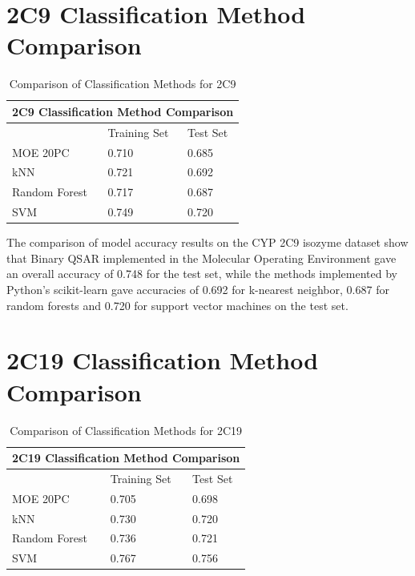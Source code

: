 \section{2C9 Classification Method Comparison}

\begin{table}[H]
\caption{Comparison of Classification Methods for 2C9}
\centering
\begin{tabular}{|l|l|l|}
\hline
\multicolumn{3}{|c|}{2C9 Classification Method Comparison} \\ \hline
          & Training Set & Test Set \\ \hline
MOE 20PC  & 0.710        & 0.685    \\ \hline
kNN       & 0.721        & 0.692    \\ \hline
Random Forest & 0.717    & 0.687    \\ \hline
SVM       & 0.749        & 0.720    \\ \hline
\end{tabular}
\end{table}

The comparison of model accuracy results on the CYP 2C9 isozyme dataset show that Binary QSAR implemented in the Molecular Operating Environment gave an overall accuracy of 0.748 for the test set, while the methods implemented by Python's scikit-learn gave accuracies of 0.692 for k-nearest neighbor, 0.687 for random forests and 0.720 for support vector machines on the test set.

\section{2C19 Classification Method Comparison}

\begin{table}[H]
\caption{Comparison of Classification Methods for 2C19}
\centering
\begin{tabular}{|l|l|l|}
\hline
\multicolumn{3}{|c|}{2C19 Classification Method Comparison} \\ \hline
          & Training Set & Test Set \\ \hline
MOE 20PC  & 0.705        & 0.698    \\ \hline
kNN       & 0.730        & 0.720    \\ \hline
Random Forest & 0.736    & 0.721    \\ \hline
SVM       & 0.767        & 0.756    \\ \hline
\end{tabular}
\end{table}

